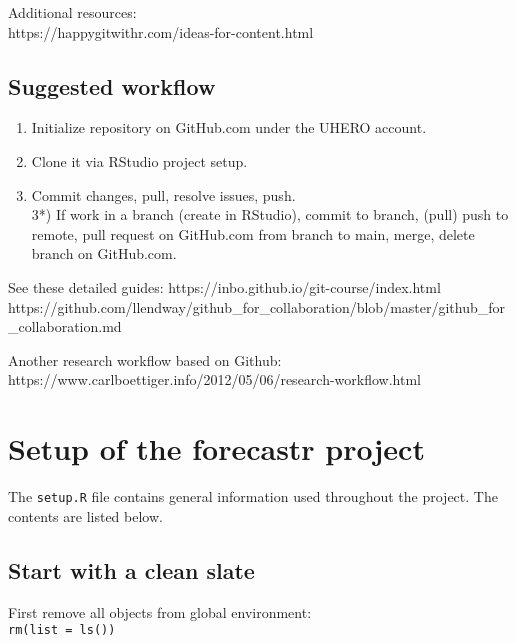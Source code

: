 \documentclass[
  letterpaper,
  DIV=11,
  numbers=noendperiod]{scrreport}
\providecommand{\tightlist}{%
  \setlength{\itemsep}{0pt}\setlength{\parskip}{0pt}}\usepackage{longtable,booktabs,array}
\begin{document}
Additional resources:\\
https://happygitwithr.com/ideas-for-content.html

\hypertarget{suggested-workflow}{%
\section{Suggested workflow}\label{suggested-workflow}}

\begin{enumerate}
\def\labelenumi{\arabic{enumi})}
\tightlist
\item
  Initialize repository on GitHub.com under the UHERO account.\\
\item
  Clone it via RStudio project setup.\\
\item
  Commit changes, pull, resolve issues, push.\\
  3*) If work in a branch (create in RStudio), commit to branch, (pull)
  push to remote, pull request on GitHub.com from branch to main, merge,
  delete branch on GitHub.com.
\end{enumerate}

See these detailed guides: https://inbo.github.io/git-course/index.html
https://github.com/llendway/github\_for\_collaboration/blob/master/github\_for\_collaboration.md

Another research workflow based on Github:
https://www.carlboettiger.info/2012/05/06/research-workflow.html


\hypertarget{setup-of-the-forecastr-project}{%
\chapter{Setup of the forecastr
project}\label{setup-of-the-forecastr-project}}

The \texttt{setup.R} file contains general information used throughout
the project. The contents are listed below.

\hypertarget{start-with-a-clean-slate}{%
\section{Start with a clean slate}\label{start-with-a-clean-slate}}

First remove all objects from global environment:\\
\texttt{rm(list\ =\ ls())}
\end{document}
